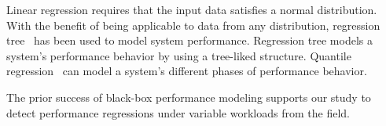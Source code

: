 Linear regression requires that the input data satisfies a normal distribution. With the benefit of being applicable to data from any distribution, regression tree~\citep{DBLP:conf/wosp/XiongPZG13} has been used to model system performance. Regression tree models a system's performance behavior by using a tree-liked structure. Quantile regression~\citep{DBLP:conf/asplos/OliveiraFDHS13} can model a system's different phases of performance behavior.

The prior success of black-box performance modeling supports our study to detect performance regressions under variable workloads from the field.